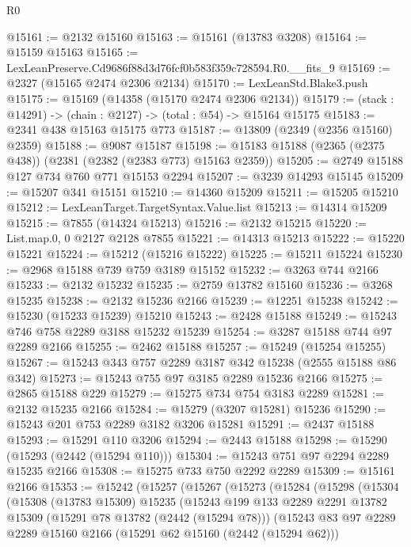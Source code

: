 \begin{lexlean}{R0}
\begin{coremodule}
@15161 := @2132 @15160
@15163 := @15161 (@13783 @3208)
@15164 := @15159 @15163
@15165 := LexLeanPreserve.Cd9686f88d3d76fcf0b583f359c728594.R0.__fits_9
@15169 := @2327 (@15165 @2474 @2306 @2134)
@15170 := LexLeanStd.Blake3.push
@15175 := @15169 (@14358 (@15170 @2474 @2306 @2134))
@15179 := (stack : @14291) -> (chain : @2127) -> (total : @54) -> @15164 @15175
@15183 := @2341 @438 @15163 @15175 @773
@15187 := @13809 (@2349 (@2356 @15160) @2359)
@15188 := @9087 @15187
@15198 := @15183 @15188 (@2365 (@2375 @438)) (@2381 (@2382 (@2383 @773) @15163 @2359))
@15205 := @2749 @15188 @127 @734 @760 @771 @15153 @2294
@15207 := @3239 @14293 @15145
@15209 := @15207 @341 @15151
@15210 := @14360 @15209
@15211 := @15205 @15210
@15212 := LexLeanTarget.TargetSyntax.Value.list
@15213 := @14314 @15209
@15215 := @7855 (@14324 @15213)
@15216 := @2132 @15215
@15220 := List.map.{0, 0} @2127 @2128 @7855
@15221 := @14313 @15213
@15222 := @15220 @15221
@15224 := @15212 (@15216 @15222)
@15225 := @15211 @15224
@15230 := @2968 @15188 @739 @759 @3189 @15152
@15232 := @3263 @744 @2166
@15233 := @2132 @15232
@15235 := @2759 @13782 @15160
@15236 := @3268 @15235
@15238 := @2132 @15236 @2166
@15239 := @12251 @15238
@15242 := @15230 (@15233 @15239) @15210
@15243 := @2428 @15188
@15249 := @15243 @746 @758 @2289 @3188 @15232 @15239
@15254 := @3287 @15188 @744 @97 @2289 @2166
@15255 := @2462 @15188
@15257 := @15249 (@15254 @15255)
@15267 := @15243 @343 @757 @2289 @3187 @342 @15238 (@2555 @15188 @86 @342)
@15273 := @15243 @755 @97 @3185 @2289 @15236 @2166
@15275 := @2865 @15188 @229
@15279 := @15275 @734 @754 @3183 @2289
@15281 := @2132 @15235 @2166
@15284 := @15279 (@3207 @15281) @15236
@15290 := @15243 @201 @753 @2289 @3182 @3206 @15281
@15291 := @2437 @15188
@15293 := @15291 @110 @3206
@15294 := @2443 @15188
@15298 := @15290 (@15293 (@2442 (@15294 @110)))
@15304 := @15243 @751 @97 @2294 @2289 @15235 @2166
@15308 := @15275 @733 @750 @2292 @2289
@15309 := @15161 @2166
@15353 := @15242
    (@15257
      (@15267
        (@15273
          (@15284
            (@15298
              (@15304
                (@15308
                  (@13783 @15309)
                  @15235
                  (@15243
                    @199
                    @133
                    @2289
                    @2291
                    @13782
                    @15309
                    (@15291 @78 @13782 (@2442 (@15294 @78)))
                    (@15243
                      @83
                      @97
                      @2289
                      @2289
                      @15160
                      @2166
                      (@15291 @62 @15160 (@2442 (@15294 @62)))

\end{coremodule}
\end{lexlean}
